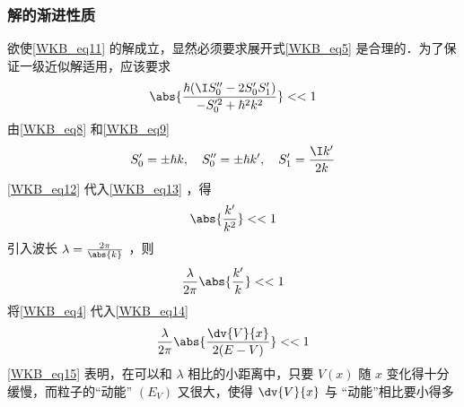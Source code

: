 \subsubsection{解的渐进性质}
欲使\autoref{WKB_eq11} 的解成立，显然必须要求展开式\autoref{WKB_eq5} 是合理的．为了保证一级近似解适用，应该要求
\begin{equation}\label{WKB_eq13}
\abs{\frac{\hbar(\I S_0''-2S_0'S_1')}{-S_0'^2+\hbar^2k^2}}<<1
\end{equation}
由\autoref{WKB_eq8} 和\autoref{WKB_eq9} 
\begin{equation}\label{WKB_eq12}
S_0'=\pm\hbar k,\quad S_0''=\pm\hbar k',\quad S_1'=\frac{\I k'}{2k}
\end{equation}
\autoref{WKB_eq12} 代入\autoref{WKB_eq13} ，得
\begin{equation}
\abs{\frac{k'}{k^2}}<<1
\end{equation}
引入波长 $\lambda=\frac{2\pi}{\abs{k}}$ ，则
\begin{equation}\label{WKB_eq14}
\frac{\lambda}{2\pi}\abs{\frac{k'}{k}}<<1
\end{equation}
将\autoref{WKB_eq4} 代入\autoref{WKB_eq14} 
\begin{equation}\label{WKB_eq15}
\frac{\lambda}{2\pi}\abs{\frac{\dv{V}{x}}{2(E-V)}}<<1
\end{equation}
\autoref{WKB_eq15} 表明，在可以和 $\lambda$ 相比的小距离中，只要 $V(x)$ 随 $x$ 变化得十分缓慢，而粒子的“动能” $(E_V)$ 又很大，使得 $\dv{V}{x}$ 与 “动能”相比要小得多

